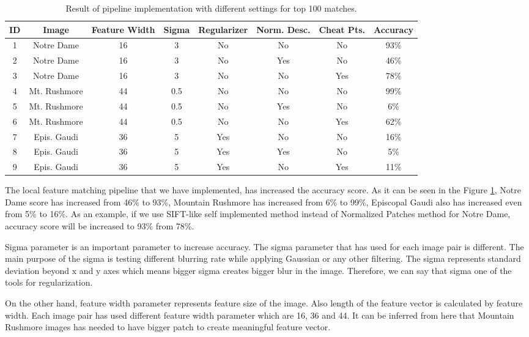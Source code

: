 \documentclass[a4paper]{article}
\begin{document}
\begin{table}[!htbp]
\centering
\begin{tabular}{||c c c c c c c c||} 
 \hline
 ID & Image & Feature Width & Sigma & Regularizer & Norm. Desc. & Cheat Pts. & Accuracy \\ [0.5ex] 
 \hline\hline
 1 & Notre Dame & 16 & 3 & No & No & No & 93\%\\ 
 2 & Notre Dame & 16 & 3 & No & Yes & No & 46\%  \\
 3 & Notre Dame & 16 & 3 & No & No & Yes & 78\%  \\
 4 & Mt. Rushmore & 44 & 0.5 & No & No & No & 99\% \\
 5 & Mt. Rushmore & 44 & 0.5 & No & Yes & No & 6\% \\
 6 & Mt. Rushmore & 44 & 0.5 & No & No & Yes & 62\% \\
 7 & Epis. Gaudi & 36 & 5 & Yes & No & No & 16\% \\ 
 8 & Epis. Gaudi & 36 & 5 & Yes & Yes & No & 5\% \\ 
 9 & Epis. Gaudi & 36 & 5 & Yes & No & Yes & 11\% \\  [1ex] 
 \hline
\end{tabular}
\caption{Result of pipeline implementation with different settings for top 100 matches.}\label{notre-table}
\end{table}

The local feature matching pipeline that we have implemented, has increased the accuracy score. As it can be seen in the Figure \ref{notre-table}, Notre Dame score has increased from 46\% to 93\%, Mountain Rushmore has increased from 6\% to 99\%, Episcopal Gaudi also has increased even from 5\% to 16\%. As an example, if we use SIFT-like self implemented method instead of Normalized Patches method for Notre Dame, accuracy score will be increased to 93\% from 78\%.

Sigma parameter is an important parameter to increase accuracy. The sigma parameter that has used for each image pair is different. The main purpose of the sigma is testing different blurring rate while applying Gaussian or any other filtering. The sigma represents standard deviation beyond x and y axes which means bigger sigma creates bigger blur in the image. Therefore, we can say that sigma one of the tools for regularization.

On the other hand, feature width parameter represents feature size of the image. Also length of the feature vector is calculated by feature width. Each image pair has used different feature width parameter which are 16, 36 and 44. It can be inferred from here that Mountain Rushmore images has needed to have bigger patch to create meaningful feature vector.
\end{document}

